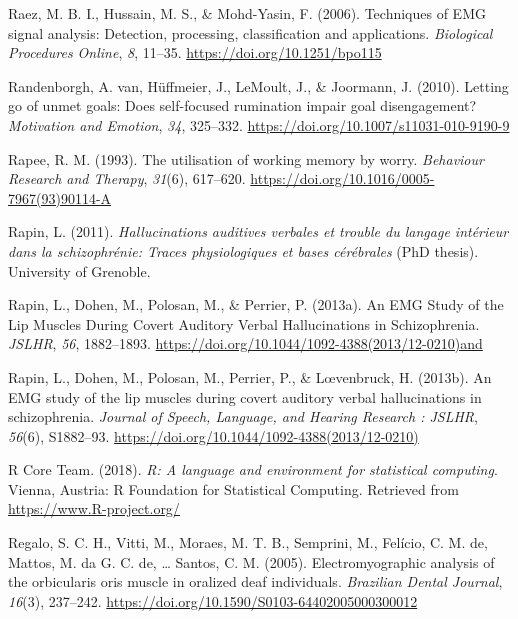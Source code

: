 \documentclass[a4paper,12pt,twoside,openright,oldfontcommands]{memoir}
\begin{document}
\leavevmode\hypertarget{ref-raez_techniques_2006}{}%
Raez, M. B. I., Hussain, M. S., \& Mohd-Yasin, F. (2006). Techniques of EMG signal analysis: Detection, processing, classification and applications. \emph{Biological Procedures Online}, \emph{8}, 11--35. \url{https://doi.org/10.1251/bpo115}

\leavevmode\hypertarget{ref-VanRandenborgh2010}{}%
Randenborgh, A. van, Hüffmeier, J., LeMoult, J., \& Joormann, J. (2010). Letting go of unmet goals: Does self-focused rumination impair goal disengagement? \emph{Motivation and Emotion}, \emph{34}, 325--332. \url{https://doi.org/10.1007/s11031-010-9190-9}

\leavevmode\hypertarget{ref-rapee_utilisation_1993}{}%
Rapee, R. M. (1993). The utilisation of working memory by worry. \emph{Behaviour Research and Therapy}, \emph{31}(6), 617--620. \url{https://doi.org/10.1016/0005-7967(93)90114-A}

\leavevmode\hypertarget{ref-Rapin2011}{}%
Rapin, L. (2011). \emph{Hallucinations auditives verbales et trouble du langage intérieur dans la schizophrénie: Traces physiologiques et bases cérébrales} (PhD thesis). University of Grenoble.

\leavevmode\hypertarget{ref-rapin_emg_2013}{}%
Rapin, L., Dohen, M., Polosan, M., \& Perrier, P. (2013a). An EMG Study of the Lip Muscles During Covert Auditory Verbal Hallucinations in Schizophrenia. \emph{JSLHR}, \emph{56}, 1882--1893. \url{https://doi.org/10.1044/1092-4388(2013/12-0210)and}

\leavevmode\hypertarget{ref-Rapin2013}{}%
Rapin, L., Dohen, M., Polosan, M., Perrier, P., \& Lœvenbruck, H. (2013b). An EMG study of the lip muscles during covert auditory verbal hallucinations in schizophrenia. \emph{Journal of Speech, Language, and Hearing Research : JSLHR}, \emph{56}(6), S1882--93. \url{https://doi.org/10.1044/1092-4388(2013/12-0210)}

\leavevmode\hypertarget{ref-R-base}{}%
R Core Team. (2018). \emph{R: A language and environment for statistical computing}. Vienna, Austria: R Foundation for Statistical Computing. Retrieved from \url{https://www.R-project.org/}

\leavevmode\hypertarget{ref-regalo_electromyographic_2005}{}%
Regalo, S. C. H., Vitti, M., Moraes, M. T. B., Semprini, M., Felício, C. M. de, Mattos, M. da G. C. de, \ldots{} Santos, C. M. (2005). Electromyographic analysis of the orbicularis oris muscle in oralized deaf individuals. \emph{Brazilian Dental Journal}, \emph{16}(3), 237--242. \url{https://doi.org/10.1590/S0103-64402005000300012}
\end{document}
